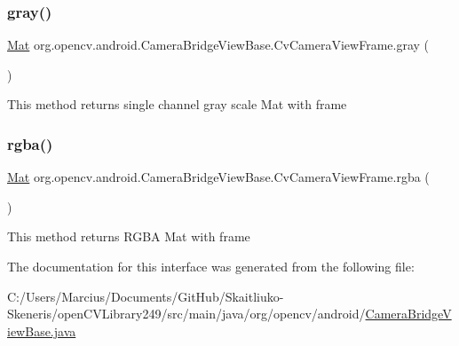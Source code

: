 \subsubsection{\texorpdfstring{gray()}{gray()}}
{\footnotesize\ttfamily \mbox{\hyperlink{classorg_1_1opencv_1_1core_1_1_mat}{Mat}} org.\+opencv.\+android.\+Camera\+Bridge\+View\+Base.\+Cv\+Camera\+View\+Frame.\+gray (\begin{DoxyParamCaption}{ }\end{DoxyParamCaption})}

This method returns single channel gray scale Mat with frame \mbox{\label{interfaceorg_1_1opencv_1_1android_1_1_camera_bridge_view_base_1_1_cv_camera_view_frame_ac668abbfa56c675ada3933e574b153d9}} 
\subsubsection{\texorpdfstring{rgba()}{rgba()}}
{\footnotesize\ttfamily \mbox{\hyperlink{classorg_1_1opencv_1_1core_1_1_mat}{Mat}} org.\+opencv.\+android.\+Camera\+Bridge\+View\+Base.\+Cv\+Camera\+View\+Frame.\+rgba (\begin{DoxyParamCaption}{ }\end{DoxyParamCaption})}

This method returns R\+G\+BA Mat with frame 

The documentation for this interface was generated from the following file\+:\begin{DoxyCompactItemize}
\item 
C\+:/\+Users/\+Marcius/\+Documents/\+Git\+Hub/\+Skaitliuko-\/\+Skeneris/open\+C\+V\+Library249/src/main/java/org/opencv/android/\mbox{\hyperlink{_camera_bridge_view_base_8java}{Camera\+Bridge\+View\+Base.\+java}}\end{DoxyCompactItemize}
